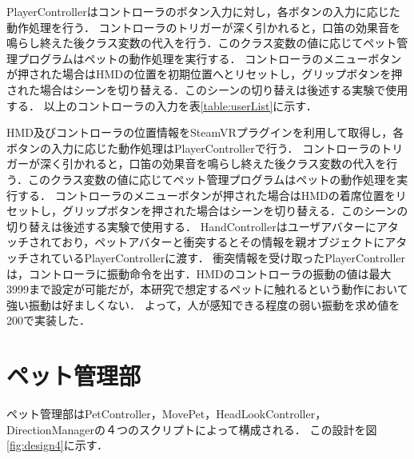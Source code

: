 PlayerControllerはコントローラのボタン入力に対し，各ボタンの入力に応じた動作処理を行う．
コントローラのトリガーが深く引かれると，口笛の効果音を鳴らし終えた後クラス変数の代入を行う．このクラス変数の値に応じてペット管理プログラムはペットの動作処理を実行する．
コントローラのメニューボタンが押された場合はHMDの位置を初期位置へとリセットし，グリップボタンを押された場合はシーンを切り替える．このシーンの切り替えは後述する実験で使用する．
以上のコントローラの入力を表\ref{table:userList}に示す．

\begin{table}[H]
\centering
\caption{コントローラの入力一覧}
\label{table:userList}
\end{table}

HMD及びコントローラの位置情報をSteamVRプラグインを利用して取得し，各ボタンの入力に応じた動作処理はPlayerControllerで行う．
コントローラのトリガーが深く引かれると，口笛の効果音を鳴らし終えた後クラス変数の代入を行う．このクラス変数の値に応じてペット管理プログラムはペットの動作処理を実行する．
コントローラのメニューボタンが押された場合はHMDの着席位置をリセットし，グリップボタンを押された場合はシーンを切り替える．このシーンの切り替えは後述する実験で使用する．
HandControllerはユーザアバターにアタッチされており，ペットアバターと衝突するとその情報を親オブジェクトにアタッチされているPlayerControllerに渡す．
衝突情報を受け取ったPlayerControllerは，コントローラに振動命令を出す．HMDのコントローラの振動の値は最大3999まで設定が可能だが，本研究で想定するペットに触れるという動作において強い振動は好ましくない．
よって，人が感知できる程度の弱い振動を求め値を200で実装した．

\section{ペット管理部}

ペット管理部はPetController，MovePet，HeadLookController，DirectionManagerの４つのスクリプトによって構成される．
この設計を図\ref{fig:design4}に示す．

